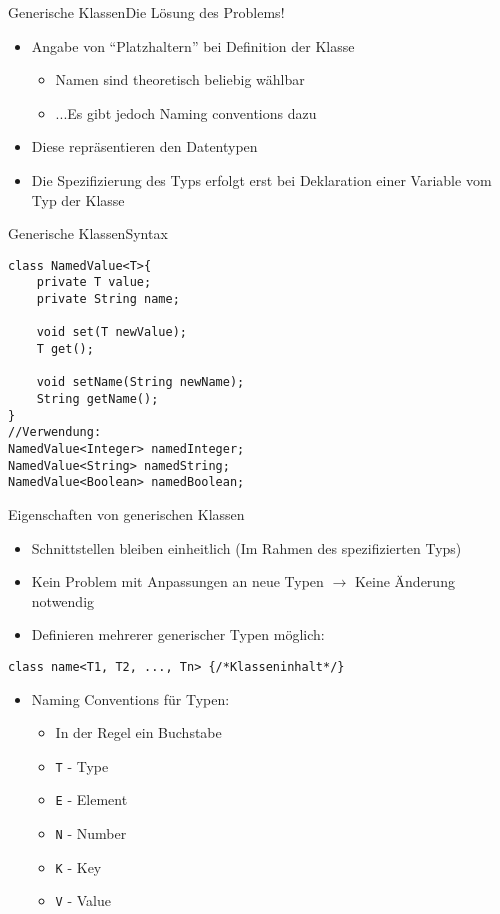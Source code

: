 \begin{frame}{Generische Klassen}{Die Lösung des Problems!}
    \begin{itemize}
        \item Angabe von "`Platzhaltern"' bei Definition der Klasse
        \begin{itemize}
            \item Namen sind theoretisch beliebig wählbar
            \item ...Es gibt jedoch Naming conventions dazu
        \end{itemize}
        \item Diese repräsentieren den Datentypen
        \item Die Spezifizierung des Typs erfolgt erst bei Deklaration einer Variable vom Typ der Klasse
    \end{itemize}
\end{frame}

\begin{frame}[fragile]{Generische Klassen}{Syntax}
\lstset{style=javacode}
\begin{lstlisting}
class NamedValue<T>{
    private T value;
    private String name;
    
    void set(T newValue);
    T get();
    
    void setName(String newName);
    String getName();
}
//Verwendung:
NamedValue<Integer> namedInteger;
NamedValue<String> namedString;
NamedValue<Boolean> namedBoolean;
\end{lstlisting}
\end{frame}

\begin{frame}{Eigenschaften von generischen Klassen}
\begin{itemize}
    \item Schnittstellen bleiben einheitlich (Im Rahmen des spezifizierten Typs)
    \item Kein Problem mit Anpassungen an neue Typen $\rightarrow$ Keine Änderung notwendig
    \item Definieren mehrerer generischer Typen möglich:
\end{itemize}%
\lstset{style=javacode}%
\begin{lstlisting}
class name<T1, T2, ..., Tn> {/*Klasseninhalt*/}
\end{lstlisting}
\framebreak
\begin{itemize}
\item Naming Conventions für Typen:
    \begin{itemize}
        \item In der Regel ein Buchstabe
        \item \texttt{T} - Type
        \item \texttt{E} - Element
        \item \texttt{N} - Number
        \item \texttt{K} - Key
        \item \texttt{V} - Value
    \end{itemize}
\end{itemize}
\end{frame}

